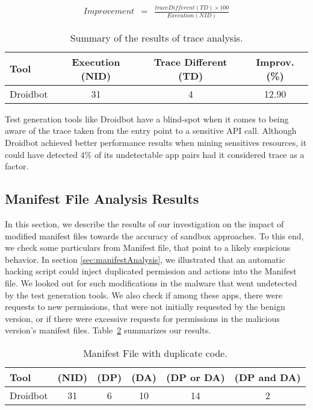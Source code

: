 \begin{eqnarray}
Improvement & = & \frac{trace Different (TD) \times 100}{Execution (NID)} 
\label{improve}
\end{eqnarray}


\begin{table}[h]
  \caption{Summary of the results of trace analysis. }
  \centering
  \begin{small}
 \begin{tabular}{lccc}
   \toprule
   Tool & Execution (NID) & Trace Different (TD) & Improv. (\%) \\   \midrule
   Droidbot &  31 & 4 & 12.90 \\
 \bottomrule
 \end{tabular}
 \end{small}
 \label{tab:pa}
\end{table}



\begin{obs}{2}{}
 Test generation tools like Droidbot have a blind-spot when it comes to being aware of the trace taken from the entry point to a sensitive API call. Although Droidbot achieved better performance results when mining sensitives resources, it could have detected $4\%$ of its undetectable app pairs had it considered trace as a factor.
 \end{obs}

\subsection{Manifest File Analysis Results}\label{sec:manifestResults}

In this section, we describe the results of our investigation on the impact of modified manifest files towards the accuracy of sandbox approaches. 
To this end, we check some particulars from Manifest file, that point to a likely suspicious behavior. In section \ref{sec:manifestAnalysis}, we illustrated that an automatic hacking script could inject duplicated permission and actions into the Manifest file. We looked out for such modifications in the malware that went undetected by the test generation tools. We also check if among these apps, there were requests to new permissions, that were not initially requested by the benign version, or if there were excessive requests for permissions in the malicious version's manifest files. Table~\ref{tab:mfa} summarizes our results. 

\begin{table}[ht]
  \caption{Manifest File with duplicate code.}
  \centering
  \begin{small}
 \begin{tabular}{lccccc}
   \toprule
   Tool & (NID) & (DP) & (DA) & (DP or DA) & (DP and DA) \\   \midrule
   Droidbot &  31 & 6 & 10 & 14 & 2 \\ 
   
 \bottomrule
 \end{tabular}
 \end{small}
 \label{tab:mfa}
\end{table}

